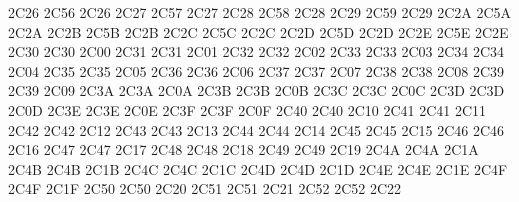 \setcclcuc 2C26 2C56 2C26 %
\setcclcuc 2C27 2C57 2C27 %
\setcclcuc 2C28 2C58 2C28 %
\setcclcuc 2C29 2C59 2C29 %
\setcclcuc 2C2A 2C5A 2C2A %
\setcclcuc 2C2B 2C5B 2C2B %
\setcclcuc 2C2C 2C5C 2C2C %
\setcclcuc 2C2D 2C5D 2C2D %
\setcclcuc 2C2E 2C5E 2C2E %
\setcclcuc 2C30 2C30 2C00 %
\setcclcuc 2C31 2C31 2C01 %
\setcclcuc 2C32 2C32 2C02 %
\setcclcuc 2C33 2C33 2C03 %
\setcclcuc 2C34 2C34 2C04 %
\setcclcuc 2C35 2C35 2C05 %
\setcclcuc 2C36 2C36 2C06 %
\setcclcuc 2C37 2C37 2C07 %
\setcclcuc 2C38 2C38 2C08 %
\setcclcuc 2C39 2C39 2C09 %
\setcclcuc 2C3A 2C3A 2C0A %
\setcclcuc 2C3B 2C3B 2C0B %
\setcclcuc 2C3C 2C3C 2C0C %
\setcclcuc 2C3D 2C3D 2C0D %
\setcclcuc 2C3E 2C3E 2C0E %
\setcclcuc 2C3F 2C3F 2C0F %
\setcclcuc 2C40 2C40 2C10 %
\setcclcuc 2C41 2C41 2C11 %
\setcclcuc 2C42 2C42 2C12 %
\setcclcuc 2C43 2C43 2C13 %
\setcclcuc 2C44 2C44 2C14 %
\setcclcuc 2C45 2C45 2C15 %
\setcclcuc 2C46 2C46 2C16 %
\setcclcuc 2C47 2C47 2C17 %
\setcclcuc 2C48 2C48 2C18 %
\setcclcuc 2C49 2C49 2C19 %
\setcclcuc 2C4A 2C4A 2C1A %
\setcclcuc 2C4B 2C4B 2C1B %
\setcclcuc 2C4C 2C4C 2C1C %
\setcclcuc 2C4D 2C4D 2C1D %
\setcclcuc 2C4E 2C4E 2C1E %
\setcclcuc 2C4F 2C4F 2C1F %
\setcclcuc 2C50 2C50 2C20 %
\setcclcuc 2C51 2C51 2C21 %
\setcclcuc 2C52 2C52 2C22 %
